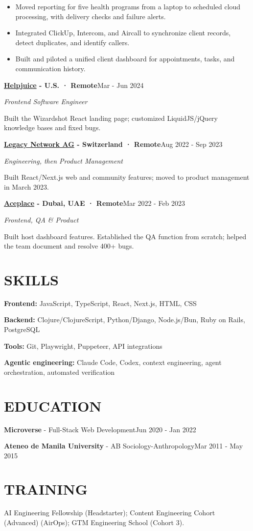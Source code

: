 \documentclass[11pt,letterpaper]{article}
\newcommand{\job}[3]{\par\vspace{1pt}\textbf{#1}\hfill #3\par\textit{#2}\par}
\begin{document}
\begin{itemize}
\item Moved reporting for five health programs from a laptop to scheduled cloud processing, with delivery checks and failure alerts.
\item Integrated ClickUp, Intercom, and Aircall to synchronize client records, detect duplicates, and identify callers.
\item Built and piloted a unified client dashboard for appointments, tasks, and communication history.
\end{itemize}
\job{\href{https://helpjuice.com/}{Helpjuice} - \textnormal{U.S. · Remote}}{Frontend Software Engineer}{Mar - Jun 2024}
Built the Wizardshot React landing page; customized LiquidJS/jQuery knowledge bases and fixed bugs.
\job{\href{https://www.legacynetwork.io/}{Legacy Network AG} - \textnormal{Switzerland · Remote}}{Engineering, then Product Management}{Aug 2022 - Sep 2023}
Built React/Next.js web and community features; moved to product management in March 2023.
\job{\href{https://aceplace.com/}{Aceplace} - \textnormal{Dubai, UAE · Remote}}{Frontend, QA \& Product}{Mar 2022 - Feb 2023}
Built host dashboard features. Established the QA function from scratch; helped the team document and resolve 400+ bugs.
\section{SKILLS}
\textbf{Frontend:} JavaScript, TypeScript, React, Next.js, HTML, CSS\par
\textbf{Backend:} Clojure/ClojureScript, Python/Django, Node.js/Bun, Ruby on Rails, PostgreSQL\par
\textbf{Tools:} Git, Playwright, Puppeteer, API integrations\par
\textbf{Agentic engineering:} Claude Code, Codex, context engineering, agent orchestration, automated verification
\section{EDUCATION}
\textbf{Microverse} - Full-Stack Web Development\hfill Jun 2020 - Jan 2022\par
\textbf{Ateneo de Manila University} - AB Sociology-Anthropology\hfill Mar 2011 - May 2015
\section{TRAINING}
AI Engineering Fellowship (Headstarter); Content Engineering Cohort (Advanced) (AirOps); GTM Engineering School (Cohort 3).
\end{document}
